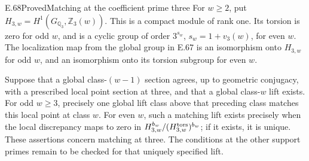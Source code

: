 \begin{result}{E.68}{Proved}{Matching at the coefficient prime three}
\label{coh:threelocalization}
For $w\geq2$, put
$H_{3,w}=H^1(G_{\mathbb Q_3},\mathbb Z_3(w))$.
This is a compact module of rank one. Its torsion is zero
for odd $w$, and is a cyclic group of order
$3^{s_w}$, $s_w=1+v_3(w)$, for even $w$.
The localization map from the global group in E.67 is an
isomorphism onto $H_{3,w}$ for odd $w$, and an isomorphism
onto its torsion subgroup for even $w$.

Suppose that a global class-$(w-1)$ section agrees, up to
geometric conjugacy, with a prescribed local point section
at three, and that a global class-$w$ lift exists. For odd
$w\geq3$, precisely one global lift class above that
preceding class matches this local point at class $w$.
For even $w$, such a matching lift exists precisely when
the local discrepancy maps to zero in
$H_{3,w}^{b_w}/(H_{3,w}^{\rm tors})^{b_w}$; if it exists,
it is unique. These assertions concern matching at three.
The conditions at the other support primes remain to be
checked for that uniquely specified lift.
\end{result}

